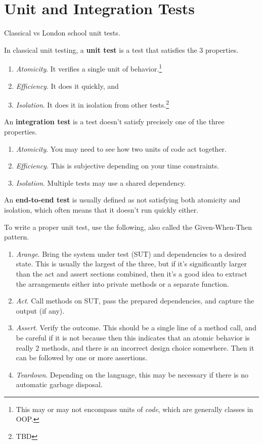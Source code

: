 \section{Unit and Integration Tests}

  Classical vs London school unit tests. 

  \begin{definition}
    In classical unit testing, a \textbf{unit test} is a test that satisfies the 3 properties. 
    \begin{enumerate}
      \item \textit{Atomicity}. It verifies a single unit of behavior.\footnote{This may or may not encompass units of \textit{code}, which are generally classes in OOP. }
      \item \textit{Efficiency}. It does it quickly, and 
      \item \textit{Isolation}. It does it in isolation from other tests.\footnote{TBD}
    \end{enumerate}
  \end{definition}

  \begin{definition}
    An \textbf{integration test} is a test doesn't satisfy precisely one of the three properties. 
    \begin{enumerate}
      \item \textit{Atomicity}. You may need to see how two units of code act together. 
      \item \textit{Efficiency}. This is subjective depending on your time constraints. 
      \item \textit{Isolation}. Multiple tests may use a shared dependency. 
    \end{enumerate}
    An \textbf{end-to-end test} is usually defined as not satisfying both atomicity and isolation, which often means that it doesn't run quickly either.  
  \end{definition} 

  To write a proper unit test, use the following, also called the Given-When-Then pattern. 
  \begin{enumerate}
    \item \textit{Arange}. Bring the system under test (SUT) and dependencies to a desired state. This is usually the largest of the three, but if it's significantly larger than the act and assert sections combined, then it's a good idea to extract the arrangements either into private methods or a separate function. 
    \item \textit{Act}. Call methods on SUT, pass the prepared dependencies, and capture the output (if any). 
    \item \textit{Assert}. Verify the outcome. This should be a single line of a method call, and be careful if it is not because then this indicates that an atomic behavior is really 2 methods, and there is an incorrect design choice somewhere. Then it can be followed by one or more assertions. 
    \item \textit{Teardown}. Depending on the language, this may be necessary if there is no automatic garbage disposal. 
  \end{enumerate}

